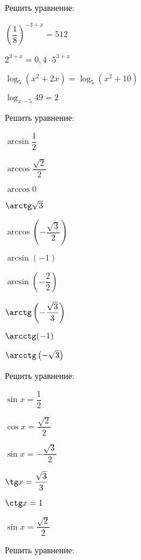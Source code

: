 \begin{listofex}
	\item Решить уравнение:
	\begin{enumcols}[itemcolumns=2]
		\item \( \left( \dfrac{1}{8} \right)^{-3+x}=512 \) 
		\item {}
		\item {}
		\item {}
		\item \( 2^{3+x}=0,4\cdot5^{3+x} \)
		\item \(\log_5(x^2+2x)=\log_5(x^2+10) \)
		\item \( \log_{x-5}49=2 \) 
	\end{enumcols}
	\item Решить уравнение:
	\begin{enumcols}[itemcolumns=4]
		\item \( \arcsin\dfrac{1}{2} \)
		\item \( \arccos\dfrac{\sqrt{2}}{2} \)
		\item \( \arccos0 \)
		\item \( \arctg\sqrt{3} \)
		\item \( \arccos\left( -\dfrac{\sqrt{3}}{2} \right) \)
		\item \( \arcsin\left( -1 \right) \)
		\item \( \arcsin\left( -\dfrac{2}{2} \right) \)
		\item \( \arctg\left( -\dfrac{\sqrt{3}}{3} \right) \)
		\item \( \arcctg(-1) \)
		\item \( \arcctg\left( -\sqrt{3} \right) \)
	\end{enumcols}
	\item Решить уравнение:
	\begin{enumcols}[itemcolumns=2]
		\item \( \sin x = \dfrac{1}{2} \)
		\item \( \cos x = \dfrac{\sqrt{2}}{2} \)
		\item \( \sin x = -\dfrac{\sqrt{3}}{2} \)
		\item \( \tg x = \dfrac{\sqrt{3}}{3} \)
		\item \( \ctg x = 1 \)
		\item \( \sin x = \dfrac{\sqrt{2}}{2} \)
	\end{enumcols}
	\item Решить уравнение:
	\begin{enumcols}[itemcolumns=3]

\end{enumcols}
\end{listofex}
